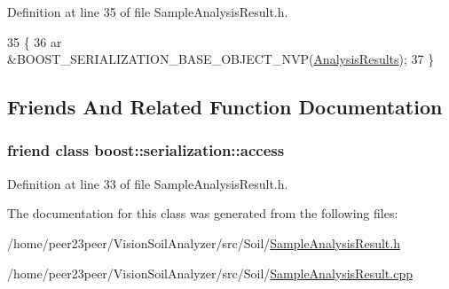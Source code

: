 Definition at line 35 of file Sample\+Analysis\+Result.\+h.


\begin{DoxyCode}
35                                                           \{
36     ar &BOOST\_SERIALIZATION\_BASE\_OBJECT\_NVP(\hyperlink{class_soil_analyzer_1_1_analysis_results_a893864c1e4bf50bf6979088a390da482}{AnalysisResults});
37   \}
\end{DoxyCode}


\subsection{Friends And Related Function Documentation}
\hypertarget{class_soil_analyzer_1_1_sample_analysis_result_ac98d07dd8f7b70e16ccb9a01abf56b9c}{}
\subsubsection[{boost\+::serialization\+::access}]{\setlength{\rightskip}{0pt plus 5cm}friend class boost\+::serialization\+::access\hspace{0.3cm}{\ttfamily [friend]}}\label{class_soil_analyzer_1_1_sample_analysis_result_ac98d07dd8f7b70e16ccb9a01abf56b9c}


Definition at line 33 of file Sample\+Analysis\+Result.\+h.



The documentation for this class was generated from the following files\+:\begin{DoxyCompactItemize}
\item 
/home/peer23peer/\+Vision\+Soil\+Analyzer/src/\+Soil/\hyperlink{_sample_analysis_result_8h}{Sample\+Analysis\+Result.\+h}\item 
/home/peer23peer/\+Vision\+Soil\+Analyzer/src/\+Soil/\hyperlink{_sample_analysis_result_8cpp}{Sample\+Analysis\+Result.\+cpp}\end{DoxyCompactItemize}
